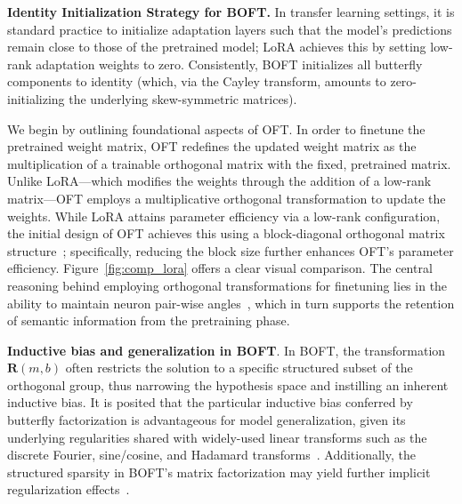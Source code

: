 \textbf{Identity Initialization Strategy for BOFT.} In transfer learning settings, it is standard practice to initialize adaptation layers such that the model's predictions remain close to those of the pretrained model; LoRA achieves this by setting low-rank adaptation weights to zero. Consistently, BOFT initializes all butterfly components to identity (which, via the Cayley transform, amounts to zero-initializing the underlying skew-symmetric matrices).

We begin by outlining foundational aspects of OFT. In order to finetune the pretrained weight matrix, OFT redefines the updated weight matrix as the multiplication of a trainable orthogonal matrix with the fixed, pretrained matrix. Unlike LoRA—which modifies the weights through the addition of a low-rank matrix—OFT employs a multiplicative orthogonal transformation to update the weights. While LoRA attains parameter efficiency via a low-rank configuration, the initial design of OFT achieves this using a block-diagonal orthogonal matrix structure~\cite{qiu2023controlling}; specifically, reducing the block size further enhances OFT’s parameter efficiency. Figure~\ref{fig:comp_lora} offers a clear visual comparison. The central reasoning behind employing orthogonal transformations for finetuning lies in the ability to maintain neuron pair-wise angles~\cite{liu2018learning,liu2021orthogonal,qiu2023controlling}, which in turn supports the retention of semantic information from the pretraining phase. 

\textbf{Inductive bias and generalization in BOFT}. In BOFT, the transformation $\bm{R}(m,b)$ often restricts the solution to a specific structured subset of the orthogonal group, thus narrowing the hypothesis space and instilling an inherent inductive bias. It is posited that the particular inductive bias conferred by butterfly factorization is advantageous for model generalization, given its underlying regularities shared with widely-used linear transforms such as the discrete Fourier, sine/cosine, and Hadamard transforms~\cite{dao2019kaleidoscope}. Additionally, the structured sparsity in BOFT’s matrix factorization may yield further implicit regularization effects~\cite{gunasekar2017implicit,li2018algorithmic,liu2019neural}.

